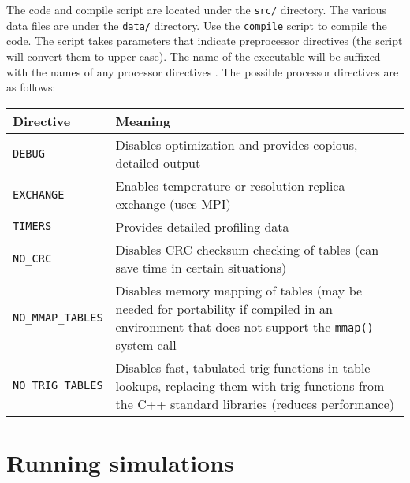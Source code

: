 \documentclass{article}      %
\begin{document}
The code and compile script are located under the \verb+src/+ directory.  The various data files are under the \verb+data/+ directory.  Use the \verb+compile+ script to compile the code.  The script takes parameters that indicate preprocessor directives (the script will convert them to upper case).  The name of the executable will be suffixed with the names of any processor directives .  The possible processor directives are as follows: \\
\begin{center}
\begin{tabular}{|l|p{8cm}|}
\hline
Directive & Meaning \\
\hline
\verb+DEBUG+ & Disables optimization and provides copious, detailed output \\
\hline
\verb+EXCHANGE+ & Enables temperature or resolution replica exchange (uses MPI) \\
\hline
\verb+TIMERS+ & Provides detailed profiling data \\
\hline
\verb+NO_CRC+ & Disables CRC checksum checking of tables (can save time in certain situations) \\
\hline
\verb+NO_MMAP_TABLES+ & Disables memory mapping of tables (may be needed for portability if compiled in an environment that does not support the \verb+mmap()+ system call \\
\hline
\verb+NO_TRIG_TABLES+ & Disables fast, tabulated trig functions in table lookups, replacing them with trig functions from the C++ standard libraries (reduces performance) \\
\hline
\end{tabular}
\end{center}

\section{Running simulations}
\end{document}
